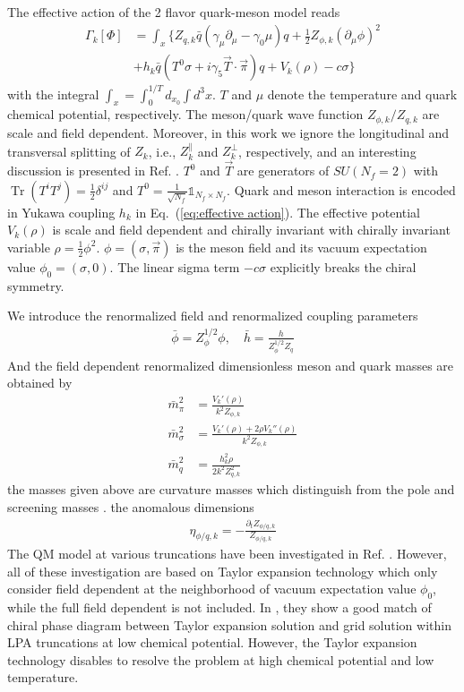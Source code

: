 \documentclass[%
reprint,
superscriptaddress,
showpacs,preprintnumbers,
 amsmath,amssymb,
 aps,
prd,
]{revtex4-1}
\newcommand{\Tr}{\ensuremath{\operatorname{Tr}}}
\def\Eq#1{Eq.~(\ref{#1})}
\begin{document}
The effective action of the 2 flavor quark-meson model reads \cite{Fu:2015naa}
\begin{align}
	\Gamma_k [\Phi]&=\int_x\{Z_{q,k} \bar q (\gamma_\mu \partial_\mu-\gamma_0 \mu)q +\frac{1}{2} Z_{\phi,k}(\partial_\mu \phi)^2  \nonumber\\[2ex]
	&+ h_k \bar q (T^0 \sigma +i \gamma_5\vec{T} \cdot \vec{\pi} )q +V_k(\rho) - c \sigma \} \label{eq:effective action}
\end{align}
with the integral $\int_x=\int_0^{1/T}d_{x_0}\int d^3 x$. $T$ and $\mu$ denote the temperature and quark chemical potential,  respectively. The meson/quark wave function $Z_{\phi,k}/Z_{q,k}$ are scale and field dependent. Moreover, in this work we ignore the  longitudinal  and transversal  splitting of $Z_k$, i.e., $Z_k^\parallel $ and $Z_k^\perp$,  respectively, and an interesting discussion is presented in Ref. \cite{Yin:2019ebz}. $T^0$ and $\vec{T}$ are generators of $SU (N_f=2)$ with $\Tr(T^iT^j)=\frac{1}{2} \delta^{ij}$ and $T^0=\frac{1}{\sqrt{N_f}} \mathbb{1}_{N_f \times N_f}$. Quark and meson interaction is encoded in Yukawa coupling $h_k$ in \Eq{eq:effective action}. The effective potential $V_k(\rho)$ is scale and field dependent and chirally invariant with chirally invariant variable $\rho=\frac{1}{2}\phi^2$. $\phi=(\sigma ,\vec{\pi})$ is the meson field and its vacuum expectation value $\phi_0=(\sigma,0)$. The linear sigma term $- c \sigma$ explicitly breaks the chiral symmetry.

We introduce the renormalized field and renormalized coupling parameters
\begin{align}
	\bar{\phi}=Z_{\phi} ^{1/2}\phi , \quad \bar{h}=\frac{h}{Z_\phi^{1/2} Z_q}
\end{align}
And the field dependent renormalized dimensionless meson and quark masses are obtained by
\begin{align}
	\bar m_\pi^2&=\frac{V_k'(\rho)}{k^2 Z_{\phi,k}} \\[2ex]
	\bar m_\sigma^2&= \frac{V_k'(\rho)+2 \rho V_k''(\rho)} {k^2 Z_{\phi,k}}\\[2ex]
	\bar m_q^2&=\frac{h_k^2 \rho}{2 k^2 Z_{q,k}^2}\label{eq:mass}
\end{align}
the masses given above are curvature masses which distinguish from the pole and screening masses \cite{Herbst:2013ufa,Alkofer:2018guy}.
the anomalous dimensions
\begin{align}
\eta_{\phi/q,k}=-\frac{\partial_t Z_{\phi/q,k}}{Z_{\phi/q,k}}
\end{align}
The QM model at various truncations have been investigated in Ref. \cite{Pawlowski:2014zaa,Fu:2015naa,Fu:2015amv,Rennecke:2016tkm,Yin:2019ebz}. However, all of these investigation are based on Taylor expansion technology which only consider field dependent at the neighborhood of vacuum expectation value $\phi_0$, while the full field dependent is not included. In \cite{Pawlowski:2014zaa}, they show a good match of chiral phase diagram between Taylor expansion solution and  grid solution within LPA truncations at low chemical potential. However, the Taylor expansion technology disables to resolve the problem at high chemical potential and low temperature.
\end{document}
